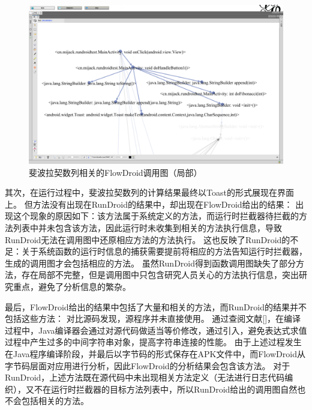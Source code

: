 \begin{figure}[!ht]
	\centering
	\includegraphics[width=\textwidth]{./Figures/FlowDroid-Fibonacci.png}
	\caption{斐波拉契数列相关的FlowDroid调用图（局部）}
	\label{fig:flowdroid-result-Fibonacci}
\end{figure}


其次，在运行过程中，斐波拉契数列的计算结果最终以Toast的形式展现在界面上。
但方法没有出现在RunDroid的结果中，却出现在FlowDroid给出的结果：
出现这个现象的原因如下：该方法属于系统定义的方法，而运行时拦截器待拦截的方法列表中并未包含该方法，因此运行时未收集到相关的方法执行信息，导致RunDroid无法在调用图中还原相应方法的方法执行。
这也反映了RunDroid的不足：关于系统函数的运行时信息的捕获需要提前将相应的方法告知运行时拦截器，生成的调用图才会包括相应的方法。
虽然RunDroid得到函数调用图缺失了部分方法，存在局部不完整，但是调用图中只包含研究人员关心的方法执行信息，突出研究重点，避免了分析信息的繁杂。



最后，FlowDroid给出的结果中包括了大量和相关的方法，而RunDroid的结果并不包括这些方法：
对比源码发现，源程序并未直接使用。
通过查阅文献[]，在编译过程中，Java编译器会通过对源代码做适当等价修改，通过引入，避免表达式求值过程中产生过多的中间字符串对象，提高字符串连接的性能。
由于上述过程发生在Java程序编译阶段，并最后以字节码的形式保存在APK文件中，而FlowDroid从字节码层面对应用进行分析，因此FlowDroid的分析结果会包含该方法。
对于RunDroid，上述方法既在源代码中未出现相关方法定义（无法进行日志代码编织），又不在运行时拦截器的目标方法列表中，所以RunDroid给出的调用图自然也不会包括相关的方法。




